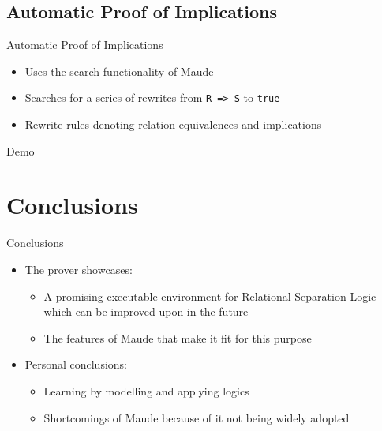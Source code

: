 \documentclass{beamer}
\begin{document}
\subsection{Automatic Proof of Implications}
\begin{frame}{Automatic Proof of Implications}
\begin{itemize}
	\item Uses the \alert{search} functionality of Maude
	\item Searches for a series of \alert{rewrites} from \texttt{R => S} to \texttt{true}  
	\item Rewrite rules denoting relation equivalences and implications
\end{itemize}
\end{frame}

\begin{frame}{Demo}
\end{frame}
\section*{Conclusions}

\begin{frame}{Conclusions}
  \begin{itemize}
  \item The prover showcases:
  	\begin{itemize}
 		  		\item A promising executable environment for Relational Separation Logic which can be improved upon in the future
  		\item The features of Maude that make it fit for this purpose
  	\end{itemize} 
  \item Personal conclusions:
  \begin{itemize}
  \item Learning by modelling and applying logics
  \item Shortcomings of Maude because of it not being widely adopted
  \end{itemize}
  \end{itemize}
 
\end{frame}
\end{document}
